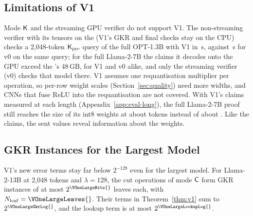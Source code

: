 \subsection{Limitations of V1}

Mode $\mathsf{K}$ and the streaming GPU verifier do not support V1. The non-streaming verifier with its
tensors on the \PlatformGpu{} (V1's GKR and final checks stay on the CPU) checks a 2{,}048-token $\mathsf{K}_{\mathrm{pre}}$
query of the full OPT-1.3B with V1 in \VOneGpuVerifyOptM{}\,s, against \VOneGpuVZeroVerifyOptM{}\,s for v0
on the same query; for the full Llama-2-7B the claims it decodes onto the GPU exceed the \PlatformGpu{}'s
48\,GB, for V1 and v0 alike, and only the streaming verifier (v0) checks that model there. V1
assumes one requantisation multiplier per operation, so per-row weight scales
(Section~\ref{sec:quality}) need more widths, and CNNs that fuse ReLU into the requantisation are
not covered. With V1's claims measured at each length (Appendix~\ref{app:eval-long}), the full
Llama-2-7B proof still reaches the size of its int8 weights at about \BreakevenTokensVOne{} tokens
instead of about \BreakevenTokens{}. Like the claims, the sent values reveal information about the
weights.

\subsection{GKR Instances for the Largest Model}
\label{ext:v1-largest}

V1's new error terms stay far below $2^{-128}$ even for the largest model. For Llama-2-13B at
2{,}048 tokens and $\lambda = 128$, the cut operations of mode $\mathsf{C}$ form \VOneLargeInstances{} GKR
instances of at most $2^{\VOneLargeBits{}}$ leaves each, with $\Nleaf=\VOneLargeLeaves{}$. Their
terms in Theorem~\ref{thm:v1} sum to $2^{\VOneLargeGkrLog{}}$, and the lookup term is at most
$2^{\VOneLargeLookupLog{}}$.
